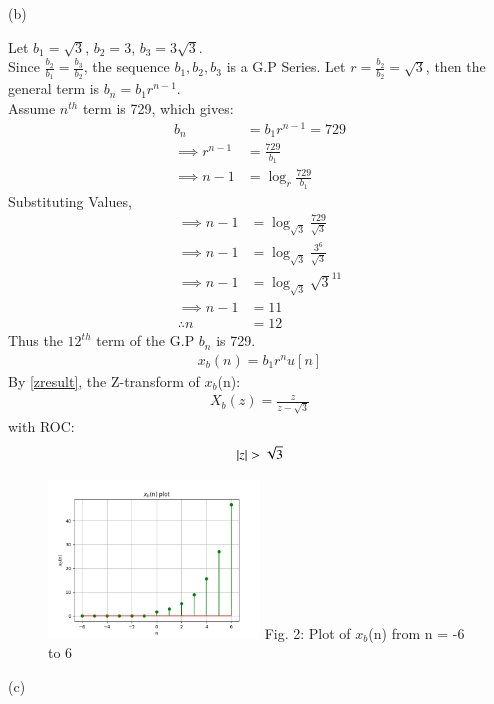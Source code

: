 \documentclass[journal,12pt,twocolumn]{IEEEtran}
\theoremstyle{remark}
\begin{document}
\newpage
(b) 



Let $b_1 = \sqrt{3}$, $b_2 = 3$, $b_3 = 3\sqrt{3}$.\\
Since $\frac{b_2}{b_1} = \frac{b_3}{b_2}$, the sequence $b_1, b_2, b_3$ is a G.P Series.
Let $r = \frac{b_2}{b_2} = \sqrt{3}$, then the general term is $b_n = b_1 r^{n-1}$.\\
Assume $n^{th}$ term is 729, which gives: 
\begin{align}
    b_n &= b_1 r^{n-1} = 729\\
    \implies r^{n-1} &= \frac{729}{b_1}\\
    \implies n - 1 &= \log_{r}{\frac{729}{b_1}}
\end{align}
Substituting Values,
\begin{align}
    \implies n - 1 &= \log_{\sqrt{3}}{\frac{729}{\sqrt{3}}}\\
    \implies n - 1 &= \log_{\sqrt{3}}{\frac{3^6}{\sqrt{3}}}\\
    \implies n - 1 &= \log_{\sqrt{3}}{\sqrt{3}^{11}}\\
    \implies n - 1 &= 11\\
    \therefore n &= 12
\end{align}
Thus the $12^{th}$ term of the G.P $b_n$ is 729.
\begin{align}  x_b(n) = b_1r^nu[n]  \end{align}
By \ref{zresult}, the Z-transform of $x_b$(n):
\begin{align} X_b(z) = \frac{z}{z - \sqrt{3}} \end{align}
with ROC: \[ \left\vert z\right\vert > \sqrt{3} \]
\begin{figure}[h!]
    \centering
    \includegraphics[width=0.5\textwidth]{figs/b.png}
    Fig. 2: Plot of $x_b$(n) from n = -6 to 6
    \label{fig:img2}
\end{figure}

(c) 


\end{document}
